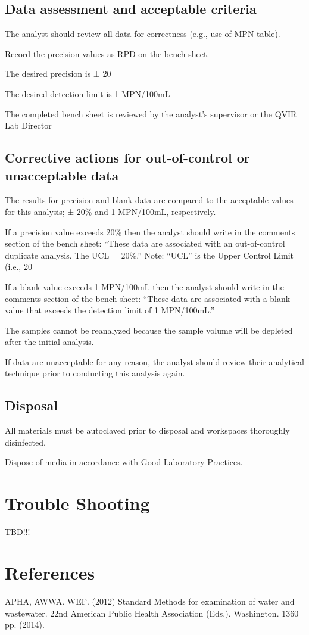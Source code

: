 \documentclass[12pt]{../SOP4_alpha}\usepackage[]{graphicx}\usepackage[]{xcolor}
\begin{document}
\subsection{Data assessment and acceptable criteria}

\NP The analyst should review all data for correctness (e.g., use of MPN table).


\NP Record the precision values as RPD on the bench sheet.

\NP The desired precision is ± 20%

\NP The desired detection limit is 1 MPN/100mL

\NP The completed bench sheet is reviewed by the analyst's supervisor or the
QVIR Lab Director 


\subsection{Corrective actions for out-of-control or unacceptable data}

\NP The results for precision and blank data are compared to the
acceptable values for this analysis; ± 20\% and 1 MPN/100mL,
respectively.

\NP If a precision value exceeds 20\% then the analyst should write in the
comments section of the bench sheet: “These data are associated
with an out-of-control duplicate analysis. The UCL = 20\%.” Note:
“UCL” is the Upper Control Limit (i.e., 20%

\NP If a blank value exceeds 1 MPN/100mL then the analyst should write
in the comments section of the bench sheet: “These data are
associated with a blank value that exceeds the detection limit of 1
MPN/100mL.”

\NP The samples cannot be reanalyzed because the sample volume will be
depleted after the initial analysis.

\NP  If data are unacceptable for any reason, the analyst should review
their analytical technique prior to conducting this analysis again. 

\subsection{Disposal}


\NP All materials must be autoclaved prior to disposal and workspaces
thoroughly disinfected.

\NP Dispose of media in accordance with Good Laboratory Practices.

\section{Trouble Shooting}

TBD!!! 


\section{References}

\NP APHA, AWWA. WEF. (2012) Standard Methods for examination of water and wastewater. 22nd American Public Health Association (Eds.). Washington. 1360 pp. (2014).
\end{document}
